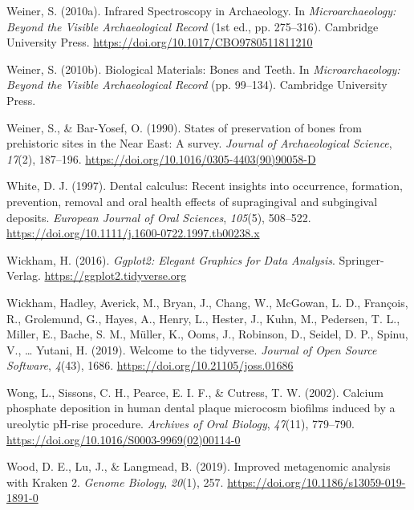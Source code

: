 \documentclass[
]{article}
\newlength{\cslhangindent}
\newlength{\cslentryspacingunit} %
\newenvironment{CSLReferences}[2] %
 {%
  \setlength{\parindent}{0pt}
  \ifodd #1
  \let\oldpar\par
  \def\par{\hangindent=\cslhangindent\oldpar}
  \fi
  \setlength{\parskip}{#2\cslentryspacingunit}
 }%
 {}
\begin{document}
\begin{CSLReferences}{1}{0}
\leavevmode{}%
Weiner, S. (2010a). Infrared {Spectroscopy} in {Archaeology}. In
\emph{Microarchaeology: {Beyond} the {Visible Archaeological Record}}
(1st ed., pp. 275--316). {Cambridge University Press}.
\url{https://doi.org/10.1017/CBO9780511811210}

\leavevmode{}%
Weiner, S. (2010b). Biological {Materials}: {Bones} and {Teeth}. In
\emph{Microarchaeology: {Beyond} the {Visible Archaeological Record}}
(pp. 99--134). {Cambridge University Press}.

\leavevmode{}%
Weiner, S., \& Bar-Yosef, O. (1990). States of preservation of bones
from prehistoric sites in the {Near East}: {A} survey. \emph{Journal of
Archaeological Science}, \emph{17}(2), 187--196.
\url{https://doi.org/10.1016/0305-4403(90)90058-D}

\leavevmode{}%
White, D. J. (1997). Dental calculus: Recent insights into occurrence,
formation, prevention, removal and oral health effects of supragingival
and subgingival deposits. \emph{European Journal of Oral Sciences},
\emph{105}(5), 508--522.
\url{https://doi.org/10.1111/j.1600-0722.1997.tb00238.x}

\leavevmode{}%
Wickham, H. (2016). \emph{Ggplot2: {Elegant Graphics} for {Data
Analysis}}. {Springer-Verlag}. \url{https://ggplot2.tidyverse.org}

\leavevmode{}%
Wickham, Hadley, Averick, M., Bryan, J., Chang, W., McGowan, L. D.,
François, R., Grolemund, G., Hayes, A., Henry, L., Hester, J., Kuhn, M.,
Pedersen, T. L., Miller, E., Bache, S. M., Müller, K., Ooms, J.,
Robinson, D., Seidel, D. P., Spinu, V., \ldots{} Yutani, H. (2019).
Welcome to the {tidyverse}. \emph{Journal of Open Source Software},
\emph{4}(43), 1686. \url{https://doi.org/10.21105/joss.01686}

\leavevmode{}%
Wong, L., Sissons, C. H., Pearce, E. I. F., \& Cutress, T. W. (2002).
Calcium phosphate deposition in human dental plaque microcosm biofilms
induced by a ureolytic {pH-rise} procedure. \emph{Archives of Oral
Biology}, \emph{47}(11), 779--790.
\url{https://doi.org/10.1016/S0003-9969(02)00114-0}

\leavevmode{}%
Wood, D. E., Lu, J., \& Langmead, B. (2019). Improved metagenomic
analysis with {Kraken} 2. \emph{Genome Biology}, \emph{20}(1), 257.
\url{https://doi.org/10.1186/s13059-019-1891-0}


\end{CSLReferences}
\end{document}
